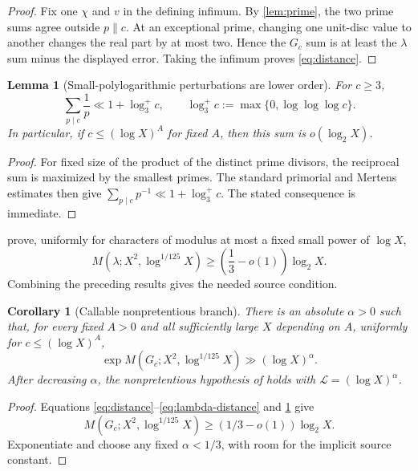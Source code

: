 \documentclass[11pt]{article}
\newtheorem{corollary}[theorem]{Corollary}
\newtheorem{lemma}[theorem]{Lemma}
\theoremstyle{definition}
\theoremstyle{remark}
\begin{document}
\begin{proof}
Fix one \(\chi\) and \(v\) in the defining infimum.  By
\cref{lem:prime}, the two prime sums agree outside \(p\parallel c\).
At an exceptional prime, changing one unit-disc value to another
changes the real part by at most two.  Hence the \(G_c\) sum is at
least the \(\lambda\) sum minus the displayed error.  Taking the
infimum proves \eqref{eq:distance}.
\end{proof}

\begin{lemma}[Small-polylogarithmic perturbations are lower order]
\label{lem:reciprocal}
For \(c\ge3\),
\[
 \sum_{p\mid c}\frac1p\ll1+\log_3^+ c,
 \qquad
 \log_3^+c:=\max\{0,\log\log\log c\}.
\]
In particular, if \(c\le(\log X)^A\) for fixed \(A\), then this sum
is \(o(\log_2X)\).
\end{lemma}

\begin{proof}
For fixed size of the product of the distinct prime divisors, the
reciprocal sum is maximized by the smallest primes.  The standard
primorial and Mertens estimates then give
\(\sum_{p\mid c}p^{-1}\ll1+\log_3^+c\).  The stated consequence is
immediate.
\end{proof}

 prove, uniformly
for characters of modulus at most a fixed small power of \(\log X\),
\begin{equation}
 M(\lambda;X^2,\log^{1/125}X)
 \ge\left(\frac13-o(1)\right)\log_2X.
\label{eq:lambda-distance}
\end{equation}
Combining the preceding results gives the needed source condition.

\begin{corollary}[Callable nonpretentious branch]
\label{cor:callable}
There is an absolute \(\alpha>0\) such that, for every fixed
\(A>0\) and all sufficiently large \(X\) depending on \(A\),
uniformly for \(c\le(\log X)^A\),
\[
 \exp M(G_c;X^2,\log^{1/125}X)
 \gg(\log X)^\alpha.
\]
After decreasing \(\alpha\), the nonpretentious hypothesis of
\citet[Theorem~3.1]{TaoTeravainen2026} holds with
\(\mathcal L=(\log X)^\alpha\).
\end{corollary}

\begin{proof}
Equations \eqref{eq:distance}--\eqref{eq:lambda-distance} and
\cref{lem:reciprocal} give
\[
 M(G_c;X^2,\log^{1/125}X)
 \ge(1/3-o(1))\log_2X.
\]
Exponentiate and choose any fixed \(\alpha<1/3\), with room for the
implicit source constant.
\end{proof}
\end{document}
